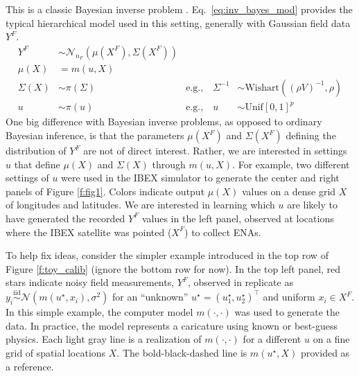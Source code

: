 \documentclass[11pt]{article}
\begin{document}
This is a classic Bayesian inverse problem
\citep{kaipio2011bayesian,stuart2010inverse,knapik2011bayesian}. Eq.~\ref{eq:inv_bayes_mod} 
provides the typical hierarchical model used in this
setting, generally with Gaussian field data $Y^F$.
\begin{align}
Y^F &\sim \mathcal{N}_{n_F}\!\left(\mu\!\left(X^F\right),
\Sigma\!\left(X^F\right)\right) \nonumber  \\
\mu(X) &= m(u, X) \label{eq:inv_bayes_mod} \\
\Sigma(X) &\sim \pi\left(\Sigma\right) & \mbox{e.g.,} \quad \Sigma^{-1} & \sim \mathrm{Wishart}((\rho V)^{-1}, \rho)
\nonumber \\
u &\sim \pi(u) & \mbox{e.g.,} \quad u &\sim \mathrm{Unif}[0,1]^p \nonumber
\end{align}
One big difference with Bayesian inverse problems, as opposed to ordinary
Bayesian inference, is that the parameters $\mu(X^F)$ and $\Sigma(X^F)$
defining the distribution of $Y^F$ are not of direct interest. Rather, we are
interested in settings $u$ that define
$\mu(X)$ and $\Sigma(X)$ through $m(u, X)$.  For example, two different
settings of $u$ were used in the IBEX simulator to generate the center and
right panels of Figure \ref{f:fig1}. Colors indicate output $\mu(X)$ values on
a dense grid $X$ of longitudes and latitudes. We are interested in learning
which $u$ are likely to have generated the recorded $Y^F$ values in the left
panel, observed at locations where the IBEX satellite was pointed ($X^F$) to
collect ENAs.

To help fix ideas, consider the simpler example introduced in the
{\color{red}top row} of Figure \ref{f:toy_calib} {\color{red} (ignore
the bottom row for now)}. {\color{red}In the top left panel,} red stars indicate noisy
field measurements, $Y^F$, observed in replicate as $y_i
\stackrel{\mathrm{iid}} \sim
\mathcal{N}(m(u^\star, x_i), \sigma^2)$ for an {\color{red}``unknown''} $u^\star =
(u_1^\star, u_2^\star)^\top$ and uniform $x_i \in X^F$.  In this simple
example, the computer model $m(\cdot, \cdot)$ was used to generate the data.
In practice, the model represents a caricature using known or best-guess
physics. Each light gray line is a realization of $m(\cdot, \cdot)$ for a
different $u$ on a fine grid of spatial locations $X$. The bold-black-dashed
line is $m(u^\star, X)$ provided as a reference.
\end{document}
